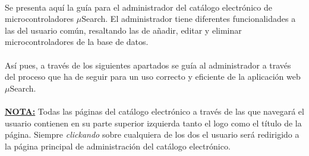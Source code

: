 \paragraph{}Se presenta aquí la guía para el administrador del catálogo electrónico de microcontroladores $\mu$Search. El administrador tiene diferentes funcionalidades a las del usuario común, resaltando las de añadir, editar y eliminar microcontroladores de la base de datos.

\paragraph{}Así pues, a través de los siguientes apartados se guía al administrador a través del proceso que ha de seguir para un uso correcto y eficiente de la aplicación web $\mu$Search.

\paragraph{}\underline{\textbf{NOTA:}} Todas las páginas del catálogo electrónico a través de las que navegará el usuario contienen en su parte superior izquierda tanto el logo como el título de la página. Siempre \textit{clickando} sobre cualquiera de los dos el usuario será redirigido a la página principal de administración del catálogo electrónico.